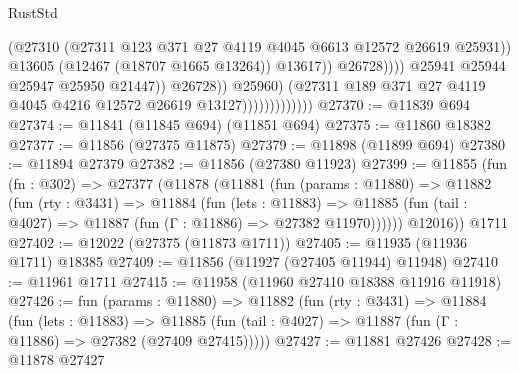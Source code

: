 \begin{lexlean}{RustStd}
\begin{coremodule}
                                                  (@27310
                                                    (@27311
                                                      @123
                                                      @371
                                                      @27
                                                      @4119
                                                      @4045
                                                      @6613
                                                      @12572
                                                      @26619
                                                      @25931))
                                                  @13605
                                                  (@12467 (@18707 @1665 @13264))
                                                  @13617))
                                              @26728))))
                                      @25941
                                      @25944
                                      @25947
                                      @25950
                                      @21447))
                                  @26728))
                              @25960)
                            (@27311
                              @189
                              @371
                              @27
                              @4119
                              @4045
                              @4216
                              @12572
                              @26619
                              @13127)))))))))))))
@27370 := @11839 @694
@27374 := @11841 (@11845 @694) (@11851 @694)
@27375 := @11860 @18382
@27377 := @11856 (@27375 @11875)
@27379 := @11898 (@11899 @694)
@27380 := @11894 @27379
@27382 := @11856 (@27380 @11923)
@27399 := @11855
    (fun (fn : @302) =>
    @27377
      (@11878
        (@11881
          (fun (params : @11880) =>
          @11882
            (fun (rty : @3431) =>
            @11884
              (fun (lets : @11883) =>
              @11885 (fun (tail : @4027) => @11887 (fun (Γ : @11886) => @27382 @11970))))))
        @12016))
    @1711
@27402 := @12022 (@27375 (@11873 @1711))
@27405 := @11935 (@11936 @1711) @18385
@27409 := @11856 (@11927 (@27405 @11944) @11948)
@27410 := @11961 @1711
@27415 := @11958 (@11960 @27410 @18388 @11916 @11918)
@27426 := fun (params : @11880) =>
  @11882
    (fun (rty : @3431) =>
    @11884
      (fun (lets : @11883) =>
      @11885 (fun (tail : @4027) => @11887 (fun (Γ : @11886) => @27382 (@27409 @27415)))))
@27427 := @11881 @27426
@27428 := @11878 @27427

\end{coremodule}
\end{lexlean}
